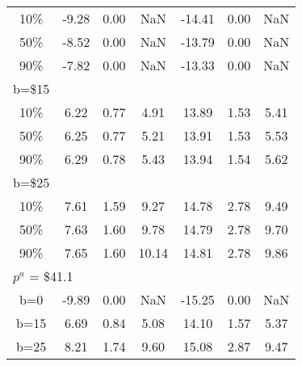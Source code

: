 \begin{tabular}[t]{ccccccc}
10\% & -9.28 & 0.00 &  NaN & -14.41& 0.00& NaN \\
50\% & -8.52 & 0.00 &  NaN & -13.79& 0.00& NaN \\
90\% & -7.82 & 0.00 &  NaN & -13.33& 0.00& NaN \\
b=\$15 &&&&&&\\
10\% & 6.22 & 0.77 & 4.91 & 13.89 & 1.53 & 5.41 \\
50\% & 6.25 & 0.77 & 5.21 & 13.91 & 1.53 & 5.53\\
90\% & 6.29 & 0.78 & 5.43 & 13.94 & 1.54  & 5.62\\
b=\$25 &&&&&&\\
10\% & 7.61 & 1.59 & 9.27  & 14.78 & 2.78 & 9.49 \\
50\% & 7.63 & 1.60 & 9.78  & 14.79 & 2.78 & 9.70 \\
90\% & 7.65 & 1.60 & 10.14 & 14.81 & 2.78 & 9.86\\
\midrule
\multicolumn{7}{l}{$p^a$ = \$41.1}  \\
b=0 &  -9.89 &   0.00 &       NaN &-15.25 &   0.00 &       NaN \\
b=15 &   6.69 &   0.84 &  5.08  &  14.10 &   1.57 &  5.37 \\
b=25 &   8.21 &   1.74 &  9.60 &  15.08 &   2.87 &  9.47 \\
\bottomrule
\end{tabular}
